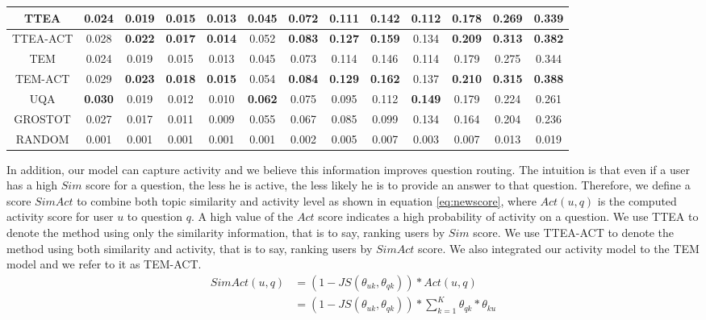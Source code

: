 {{{{{{{\begin{sidewaystable}
\begin{tabular}{|c|c|c|c|c|c|c|c|c|c|c|c|c|}
TTEA&0.024&0.019&0.015&0.013&0.045&0.072&0.111&0.142&0.112&0.178&0.269&0.339 \\ \hline
TTEA-ACT&0.028&\textbf{0.022}&\textbf{0.017}&\textbf{0.014}&0.052&\textbf{0.083}&\textbf{0.127}&\textbf{0.159}&0.134&\textbf{0.209}&\textbf{0.313}&\textbf{0.382} \\ \hline
TEM&0.024&0.019&0.015&0.013&0.045&0.073&0.114&0.146&0.114&0.179&0.275&0.344 \\ \hline
TEM-ACT&0.029&\textbf{0.023}&\textbf{0.018}&\textbf{0.015}&0.054&\textbf{0.084}&\textbf{0.129}&\textbf{0.162}&0.137&\textbf{0.210}&\textbf{0.315}&\textbf{0.388} \\ \hline
UQA&\textbf{0.030}&0.019&0.012&0.010&\textbf{0.062}&0.075&0.095&0.112&\textbf{0.149}&0.179&0.224&0.261 \\ \hline
GROSTOT&0.027&0.017&0.011&0.009&0.055&0.067&0.085&0.099&0.134&0.164&0.204&0.236 \\ \hline
RANDOM&0.001&0.001&0.001&0.001&0.001&0.002&0.005&0.007&0.003&0.007&0.013&0.019 \\ \hline
\end{tabular}
\end{sidewaystable}

In addition, our model can capture activity and we believe this information improves question routing. The intuition is that even if a user has a high $Sim$ score for a question, the less he is active, the less likely he is to provide an answer to that question. Therefore, we define a score $SimAct$ to combine both topic similarity and activity level as shown in equation \ref{eq:newscore}, where $Act(u,q)$ is the computed activity score for user $u$ to question $q$. A high value of the $Act$ score indicates a high probability of activity on a question. We use TTEA to denote the method using only the similarity information, that is to say, ranking users by $Sim$ score. We use TTEA-ACT to denote the method using both similarity and activity, that is to say, ranking users by $SimAct$ score. We also integrated our activity model to the TEM model  and we refer to it as TEM-ACT. 
\begin{equation}
\begin{split}
SimAct(u,q) &= (1 -JS(\theta_{uk},\theta_{qk}))* Act(u,q) \\
         &= (1 -JS(\theta_{uk},\theta_{qk}))* \sum_{k=1}^{K} \theta_{qk} * \theta_{ku}
\end{split}
\label{eq:newscore}
\end{equation} 

}}}}}}}

